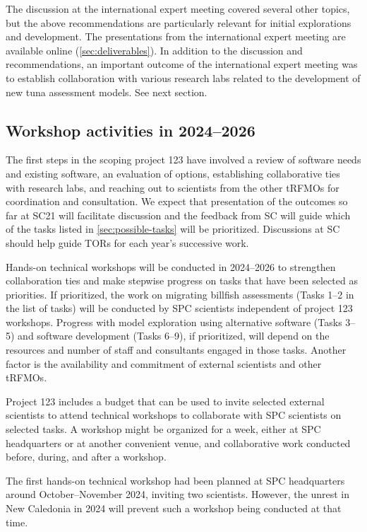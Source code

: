\documentclass{SCreport}
\begin{document}
The discussion at the international expert meeting covered several other topics,
but the above recommendations are particularly relevant for initial explorations
and development. The presentations from the international expert meeting are
available online (\autoref{sec:deliverables}). In addition to the discussion and
recommendations, an important outcome of the international expert meeting was to
establish collaboration with various research labs related to the development of
new tuna assessment models. See next section.

\subsection{Workshop activities in 2024--2026}

The first steps in the scoping project 123 have involved a review of software
needs and existing software, an evaluation of options, establishing
collaborative ties with research labs, and reaching out to scientists from the
other tRFMOs for coordination and consultation. We expect that presentation of
the outcomes so far at SC21 will facilitate discussion and the feedback from SC
will guide which of the tasks listed in \autoref{sec:possible-tasks} will be
prioritized. Discussions at SC should help guide TORs for each year's successive
work.

Hands-on technical workshops will be conducted in 2024--2026 to strengthen
collaboration ties and make stepwise progress on tasks that have been selected
as priorities. If prioritized, the work on migrating billfish assessments (Tasks
1--2 in the list of tasks) will be conducted by SPC scientists independent of
project 123 workshops. Progress with model exploration using alternative
software (Tasks 3--5) and software development (Tasks 6--9), if prioritized,
will depend on the resources and number of staff and consultants engaged in
those tasks. Another factor is the availability and commitment of external
scientists and other tRFMOs.

\newpage

Project 123 includes a budget that can be used to invite selected external
scientists to attend technical workshops to collaborate with SPC scientists on
selected tasks. A workshop might be organized for a week, either at SPC
headquarters or at another convenient venue, and collaborative work conducted
before, during, and after a workshop.

The first hands-on technical workshop had been planned at SPC headquarters
around October--November 2024, inviting two scientists. However, the unrest in
New Caledonia in 2024 will prevent such a workshop being conducted at that time.
\end{document}
